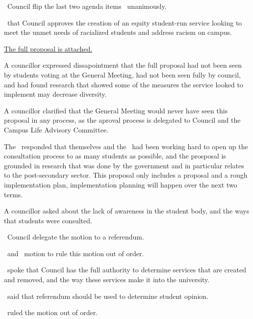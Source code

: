 \begin{motion}
    \birt\ Council flip the last two agenda items
    \movers{\seneca}{\rebecca}
    \carries\ unanimously.
\end{motion}

\begin{motion}
    \birt\ that Council approves the creation of an equity student-run service
    looking to meet the unmet needs of racialized students and address racism
    on campus.
    \movers{\antonio}{\rebecca}

    \hyperref[equity]{The full proposal is attached.}

    A councillor expressed dissapointment that the full proposal had not been
    seen by students voting at the General Meeting, had not been seen fully by
    council, and had found research that showed some of the measures the 
    service looked to implement may decrease diversity.

    A councillor clarified that the General Meeting would never have seen this
    proposal in any process, as the aproval process is delegated to Council and
    the Campus Life Advisory Committee. 

    The \pres\ responded that themselves and the \vpi\ had been working hard
    to open up the consultation process to as many students as possible, and
    the prosposal is grounded in research that was done by the government and
    in particular relates to the post-secondary sector. This proposal only 
    includes a proposal and a rough implementation plan, implementation 
    planning will happen over the next two terms.

    A councillor asked about the lack of awareness in the student body, and 
    the ways that students were consulted. 

    \begin{motion}
        \birt\ Council delegate the motion to a referendum.
        \movers{\harsh}{\alexander}

        \seneca\ and \antonio\ motion to rule this motion out of order.

        \seneca\ spoke that Council has the full authority to determine
        services that are created and removed, and the way these services make
        it into the university.

        \harsh\ said that referendum should be used to determine student
        opinion.

        \elizabeth\ ruled the motion out of order.
    \end{motion} 


\end{motion}
